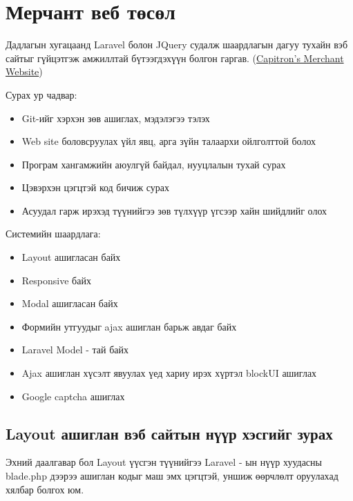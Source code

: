 \section{Мерчант веб төсөл}

Дадлагын хугацаанд Laravel болон JQuery судалж шаардлагын дагуу тухайн вэб сайтыг гүйцэтгэж амжиллтай бүтээгдэхүүн болгон гаргав. (\href{https://merchant.capitronbank.mn/}{Capitron's Merchant Website})

Сурах ур чадвар: 
\begin{itemize}
    \item Git-ийг хэрхэн зөв ашиглах, мэдэлэгээ тэлэх
    \item Web site боловсруулах үйл явц, арга зүйн талаархи ойлголттой болох
    \item Програм хангамжийн аюулгүй байдал, нууцлалын тухай сурах
    \item Цэвэрхэн цэгцтэй код бичиж сурах
    \item Асуудал гарж ирэхэд түүнийгээ зөв түлхүүр үгсээр хайн шийдлийг олох
\end{itemize}

Системийн шаардлага: 
\begin{itemize}
    \item Layout ашигласан байх
    \item Responsive байх
    \item Modal ашигласан байх
    \item Формийн утгуудыг ajax ашиглан барьж авдаг байх
    \item Laravel Model - тай байх
    \item Ajax ашиглан хүсэлт явуулах үед хариу ирэх хүртэл blockUI ашиглах
    \item Google captcha ашиглах
\end{itemize}

\subsection{Layout ашиглан вэб сайтын нүүр хэсгийг зурах}

Эхний даалгавар бол Layout үүсгэн түүнийгээ Laravel - ын нүүр хуудасны blade.php дээрээ ашиглан кодыг маш эмх цэгцтэй, уншиж өөрчлөлт оруулахад хялбар болгох юм.


